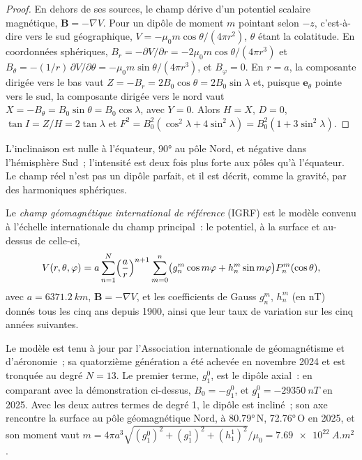 \begin{proof}
En dehors de ses sources, le champ dérive d'un potentiel scalaire magnétique,
$\mathbf B = -\nabla V$. Pour un dipôle de moment $m$ pointant selon $-z$, c'est-à-dire
vers le sud géographique, $V = -\mu_0 m\cos\theta/(4\pi r^2)$, $\theta$ étant la
colatitude. En coordonnées sphériques, $B_r = -\partial V/\partial r =
-2\mu_0 m\cos\theta/(4\pi r^3)$ et $B_\theta = -(1/r)\,\partial V/\partial\theta =
-\mu_0 m\sin\theta/(4\pi r^3)$, et $B_\varphi = 0$. En $r = a$, la composante
dirigée vers le bas vaut $Z = -B_r = 2B_0\cos\theta = 2B_0\sin\lambda$ et, puisque
$\mathbf e_\theta$ pointe vers le sud, la composante dirigée vers le nord vaut $X = -B_\theta =
B_0\sin\theta = B_0\cos\lambda$, avec $Y = 0$. Alors $H = X$, $D = 0$, $\tan I =
Z/H = 2\tan\lambda$ et $F^2 = B_0^2(\cos^2\lambda + 4\sin^2\lambda) =
B_0^2(1 + 3\sin^2\lambda)$.
\end{proof}

L'inclinaison est nulle à l'équateur, \ang{90} au pôle Nord, et
négative dans l'hémisphère Sud~; l'intensité est deux fois plus forte aux
pôles qu'à l'équateur. Le champ réel n'est pas un dipôle parfait, et il est
décrit, comme la gravité, par des harmoniques sphériques.

\begin{definition}\label{def:b3:palaeomagnetism:igrf}
Le \emph{champ géomagnétique international de référence}
(IGRF) est le modèle convenu à l'échelle internationale du
champ principal~: le potentiel, à la surface et au-dessus de celle-ci,
\[
  V(r,\theta,\varphi) = a\sum_{n=1}^{N}\Bigl(\frac ar\Bigr)^{n+1}\sum_{m=0}^{n}
  \bigl(g_n^m\cos m\varphi + h_n^m\sin m\varphi\bigr)P_n^m(\cos\theta),
\]
avec $a = \qty{6371.2}{km}$, $\mathbf B = -\nabla V$, et les coefficients de Gauss
$g_n^m$, $h_n^m$ (en \unit{nT}) donnés tous les cinq ans depuis 1900, ainsi que
leur taux de variation sur les cinq années suivantes.
\end{definition}

Le modèle est tenu à jour par l'Association internationale de géomagnétisme et
d'aéronomie~; sa quatorzième génération a été achevée en novembre 2024 et est
tronquée au degré $N = 13$. Le premier terme, $g_1^0$, est le dipôle axial~:
en comparant avec la démonstration ci-dessus, $B_0 = -g_1^0$, et $g_1^0 = \qty{-29350}{nT}$
en 2025. Avec les deux autres termes de degré 1, le dipôle est incliné~; son axe rencontre
la surface au pôle géomagnétique Nord, à \ang{80.79}\,N, \ang{72.76}\,O en
2025, et son moment vaut $m = 4\pi a^3\sqrt{(g_1^0)^2 + (g_1^1)^2 +
(h_1^1)^2}/\mu_0 = \qty{7.69e22}{A.m^2}$.

